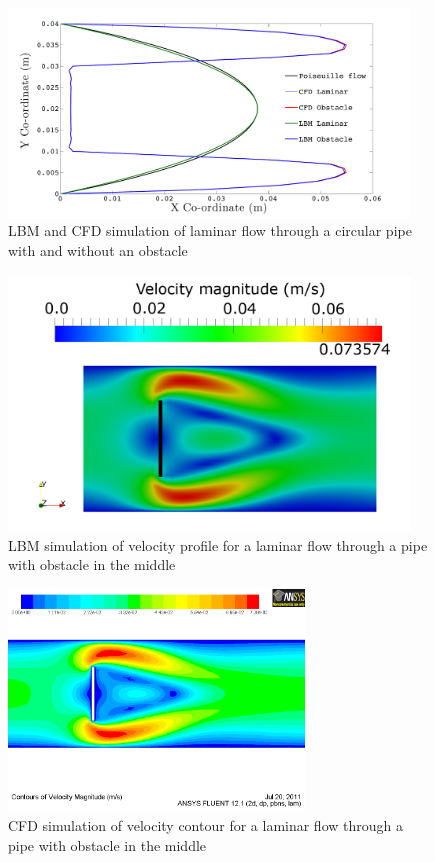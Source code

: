 \begin{figure}[h]
\centering
\includegraphics[width=0.95\textwidth]{LBMCFD}
\caption{LBM and CFD simulation of laminar flow through a circular pipe with 
and without an obstacle}
\label{fig:LBM}
\end{figure}

\begin{figure}[htbp]
\centering
\hspace{-13mm}\includegraphics[width=0.95\textwidth]{LBM_Obstacle}
\caption{LBM simulation of velocity profile for a laminar flow through a pipe 
with obstacle in the middle}
\label{fig:Obstacle}
\end{figure}

\begin{figure}[htbp]
\centering
\includegraphics[width=0.7\textwidth]{CFD_Obstacle}
\caption{CFD simulation of velocity contour for a laminar flow through a pipe 
with obstacle in the middle}
\label{fig:obsvc}
\end{figure}

